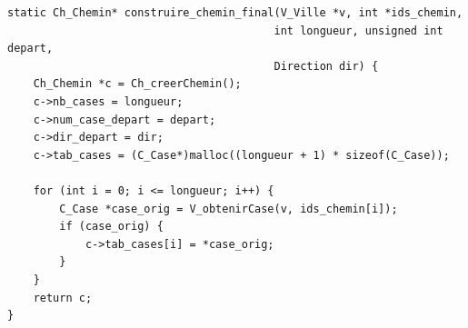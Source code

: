 \begin{lstlisting}[caption={construire\_chemin\_final}]
static Ch_Chemin* construire_chemin_final(V_Ville *v, int *ids_chemin, 
                                         int longueur, unsigned int depart, 
                                         Direction dir) {
    Ch_Chemin *c = Ch_creerChemin();
    c->nb_cases = longueur;
    c->num_case_depart = depart;
    c->dir_depart = dir;
    c->tab_cases = (C_Case*)malloc((longueur + 1) * sizeof(C_Case));
    
    for (int i = 0; i <= longueur; i++) {
        C_Case *case_orig = V_obtenirCase(v, ids_chemin[i]);
        if (case_orig) {
            c->tab_cases[i] = *case_orig;
        }
    }
    return c;
}

\end{lstlisting}